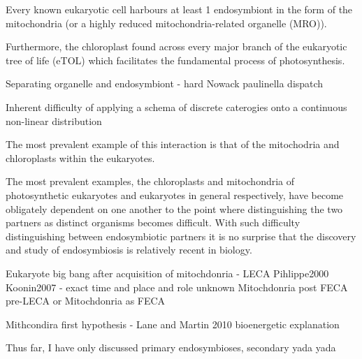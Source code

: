 
Every known eukaryotic cell harbours at least 1 endosymbiont in the form of the mitochondria (or a highly
reduced mitochondria-related organelle (MRO)). 

Furthermore, the chloroplast found across every major branch of the eukaryotic tree of life (eTOL)
which facilitates the fundamental process of photosynthesis.







Separating organelle and endosymbiont - hard \citep{Keeling2008} Nowack paulinella dispatch

Inherent difficulty of applying a schema of discrete caterogies onto a continuous non-linear distribution



The most prevalent example of this interaction is that of the mitochodria and chloroplasts 
within the eukaryotes.

The most prevalent examples, the chloroplasts and mitochondria of photosynthetic eukaryotes and 
eukaryotes in general respectively, have become obligately dependent on one another to the point where distinguishing 
the two partners as distinct organisms becomes difficult.
With such difficulty distinguishing between endosymbiotic partners it is no 
surprise that the discovery and study of endosymbiosis is relatively recent in 
biology. 



Eukaryote big bang after acquisition of mitochdonria - LECA Pihlippe2000 Koonin2007 - exact time and place and role unknown
Mitochdonria post FECA pre-LECA or Mitochdonria as FECA

Mithcondira first hypothesis - Lane and Martin 2010 bioenergetic explanation




Thus far, I have only discussed primary endosymbioses, secondary yada yada







